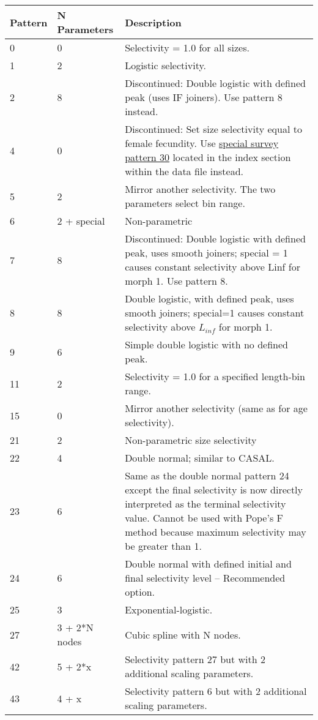 \begin{longtable}{p{2cm} p{3cm} p{10cm}}
	Pattern & N Parameters & Description \Tstrut\Bstrut\\
	\hline
	0 \Tstrut& 0 & Selectivity = 1.0 for all sizes. \\
	1 \Tstrut& 2 & Logistic selectivity.\\
	2 \Tstrut& 8 & Discontinued: Double logistic with defined peak (uses IF joiners). Use pattern 8 instead.\\
	4 \Tstrut& 0 & Discontinued: Set size selectivity equal to female fecundity. Use \hyperlink{SpecialSurvey}{special survey pattern 30} located in the index section within the data file instead.\\
	5 \Tstrut& 2 & Mirror another selectivity. The two parameters select bin range.\\
	6 \Tstrut& 2 + special & Non-parametric \\
	7 \Tstrut& 8 & Discontinued: Double logistic with defined peak, uses smooth joiners; special = 1 causes constant selectivity above Linf for morph 1.  Use pattern 8.\\
	8 \Tstrut& 8 & Double logistic, with defined peak, uses smooth joiners; special=1 causes constant selectivity above $L_{inf}$ for morph 1.  \\
	9 \Tstrut& 6 & Simple double logistic with no defined peak.\\
	11 \Tstrut& 2 & Selectivity = 1.0 for a specified length-bin range.\\
	15 \Tstrut& 0 & Mirror another selectivity (same as for age selectivity).\\
	21 \Tstrut& 2  & Non-parametric size selectivity\\
	22 \Tstrut& 4 & Double normal; similar to CASAL.\\
	23 \Tstrut& 6 & Same as the double normal pattern 24 except the final selectivity is now directly interpreted as the terminal selectivity value. Cannot be used with Pope's F method because maximum selectivity may be greater than 1.\\
	24 \Tstrut& 6 & Double normal with defined initial and final selectivity level – Recommended option.\\
	25 \Tstrut& 3 & Exponential-logistic. \\
	27 \Tstrut& 3 + 2*N nodes & Cubic spline with N nodes. \\
	42 \Tstrut& 5 + 2*x & Selectivity pattern 27 but with 2 additional scaling parameters. \\
	43 \Tstrut& 4 + x & Selectivity pattern 6 but with 2 additional scaling parameters.\Bstrut\\
	\hline
\end{longtable}


